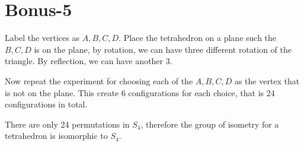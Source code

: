 \section*{Bonus-5}
Label the vertices as $ A, B, C, D $. Place the tetrahedron on a plane such the $ B,C,D $ is on the plane, by rotation, we can have three different rotation of the triangle. By reflection, we can have another 3.

Now repeat the experiment for choosing each of the $ A, B, C, D $ as the vertex that is not on the plane. This create 6 configurations for each choice, that is 24 configurations in total.

There are only 24 permutations in $ S_4 $, therefore the group of isometry for a tetrahedron is isomorphic to $ S_4 $.